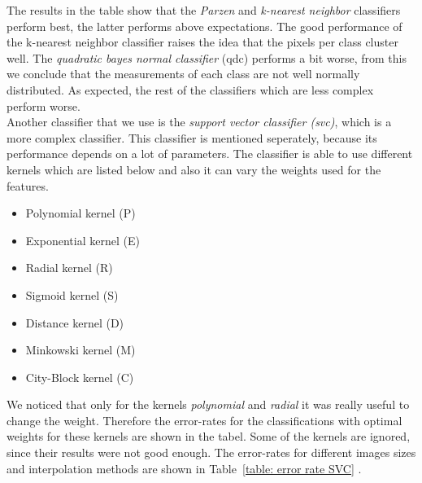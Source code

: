 \documentclass{article}
\begin{document}
The results in the table show that the \emph{Parzen} and \emph{k-nearest neighbor} classifiers perform best, the latter performs above expectations. The good performance of the k-nearest neighbor classifier raises the idea that the pixels per class cluster well. The \emph{quadratic bayes normal classifier} (qdc) performs a bit worse, from this we conclude that the measurements of each class are not well normally distributed. As expected, the rest of the classifiers which are less complex perform worse. \\

Another classifier that we use is the \textit{support vector classifier (svc)}, which is a more complex classifier. This classifier is mentioned seperately, because its performance depends on a lot of parameters. The classifier is able to use different kernels which are listed below and also it can vary the weights used for the features.

\begin{itemize}[noitemsep]
    \item Polynomial kernel (P)
    \item Exponential kernel (E)
    \item Radial kernel (R)
    \item Sigmoid kernel (S)
    \item Distance kernel (D)
    \item Minkowski kernel (M)
    \item City-Block kernel (C)
\end{itemize}

We noticed that only for the kernels \textit{polynomial} and \textit{radial} it was really useful to change the weight. Therefore the error-rates for the classifications with optimal weights for these kernels are shown in the tabel. Some of the kernels are ignored, since their results were not good enough. The error-rates for different images sizes and interpolation methods are shown in Table~\ref{table: error rate SVC} . 
\end{document}
